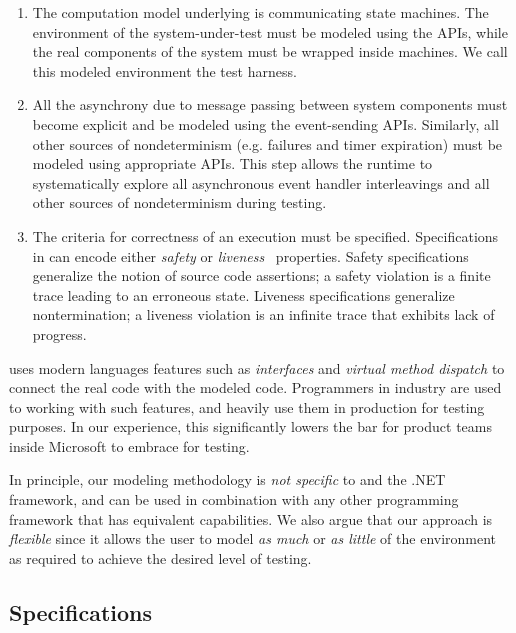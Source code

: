 \begin{enumerate}
\item
The computation model underlying \psharp is communicating state machines. The environment of the system-under-test must be modeled using the \psharp APIs, while the real components of the system must be wrapped inside \psharp machines. We call this modeled environment the \psharp test harness.

\item
All the asynchrony due to message passing between system components must become explicit and be modeled using the \psharp event-sending APIs. Similarly, all other sources of nondeterminism (e.g. failures and timer expiration) must be modeled using appropriate \psharp APIs. This step allows the \psharp runtime to systematically explore all asynchronous event handler interleavings and all other sources of nondeterminism during testing.

\item
The criteria for correctness of an execution must be specified. Specifications in \psharp can encode either \emph{safety} or \emph{liveness}~\cite{lamport1977proving} properties. Safety specifications generalize the notion of source code assertions; a safety violation is a finite trace leading to an erroneous state. Liveness specifications generalize nontermination; a liveness violation is an infinite trace that exhibits lack of progress.
\end{enumerate}

\noindent
\psharp uses modern languages features such as \emph{interfaces} and \emph{virtual method dispatch} to connect the real code with the modeled code. Programmers in industry are used to working with such features, and heavily use them in production for testing purposes. In our experience, this significantly lowers the bar for product teams inside Microsoft to embrace \psharp for testing.

In principle, our modeling methodology is \emph{not specific} to \psharp and the .NET framework, and can be used in combination with any other programming framework that has equivalent capabilities. We also argue that our approach is \emph{flexible} since it allows the user to model \emph{as much} or \emph{as little} of the environment as required to achieve the desired level of testing.

\subsection{Specifications}
\label{sec:bg:bugs}

